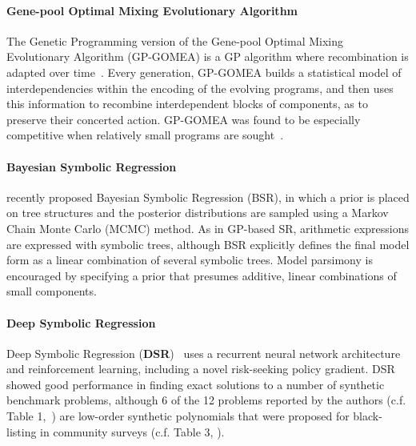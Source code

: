 \paragraph{Gene-pool Optimal Mixing Evolutionary Algorithm}

The Genetic Programming version of the Gene-pool Optimal Mixing Evolutionary Algorithm (GP-GOMEA) is a GP algorithm where recombination is adapted over time~\cite{virgolin2017scalable,virgolin2020improving}. Every generation, GP-GOMEA builds a statistical model of interdependencies within the encoding of the evolving programs, and then uses this information to recombine interdependent blocks of components, as to preserve their concerted action.
GP-GOMEA was found to be especially competitive when relatively small programs are sought~\cite{virgolin2017scalable,virgolin2020improving}.

\paragraph{Bayesian Symbolic Regression}

\citet{jinBayesianSymbolicRegression2020} recently proposed Bayesian Symbolic Regression (BSR), in which a prior is placed on tree structures and the posterior distributions are sampled using a Markov Chain Monte Carlo (MCMC) method.   
As in GP-based SR, arithmetic expressions are expressed with symbolic trees, although BSR explicitly defines the final model form as a linear combination of several symbolic trees. 
Model parsimony is encouraged by specifying a prior that presumes additive, linear combinations of small components. 

\paragraph{Deep Symbolic Regression}
Deep Symbolic Regression (\textbf{DSR})~\cite{petersenDeepSymbolicRegression2020} uses a recurrent neural network architecture and reinforcement learning, including a novel risk-seeking policy gradient. 
DSR showed good performance in finding exact solutions to a number of synthetic benchmark problems, although 6 of the 12 problems reported by the authors  (c.f. Table 1,~\cite{petersenDeepSymbolicRegression2020}) are low-order synthetic polynomials that were proposed for black-listing in community surveys (c.f. Table 3, \citet{whiteBetterGPBenchmarks2012a}).  


